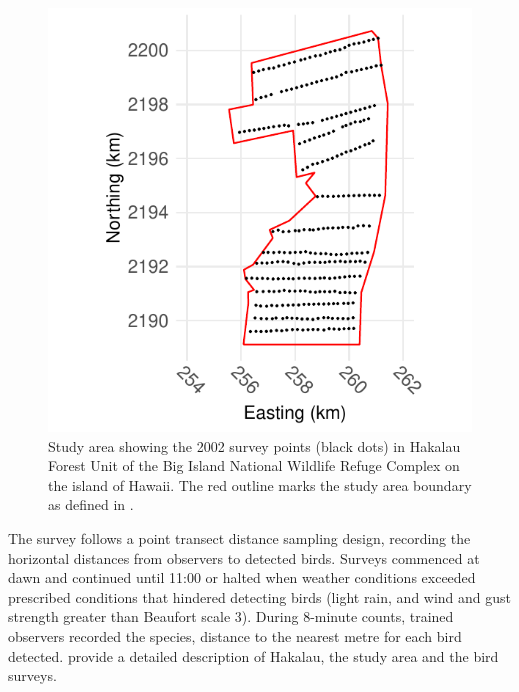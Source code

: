\documentclass{statsoc}
\newcommand{\hawaii}{Hawai\textquotesingle i}   %
\begin{document}
\begin{figure}[!htb]
	\centering
	\includegraphics{figures/study_area_design.pdf}
	\caption{Study area showing the 2002 survey points (black dots) in Hakalau Forest Unit of the Big Island National Wildlife Refuge Complex on the island of \hawaii{}.  The red outline marks the study area boundary as defined in \cite{camp_dsm_2020}.}
	\label{fig:2002studyareapointspt}
\end{figure}

The survey follows a point transect distance sampling design, recording the horizontal distances from observers to detected birds. Surveys commenced at dawn and continued until 11:00 or halted when weather conditions exceeded prescribed conditions that hindered detecting birds (light rain, and wind and gust strength greater than Beaufort scale 3). During 8-minute counts, trained observers recorded the species, distance to the nearest metre for each bird detected. \cite{camp_population_2010,camp_statespace_2016} provide a detailed description of Hakalau, the study area and the bird surveys.
\end{document}
